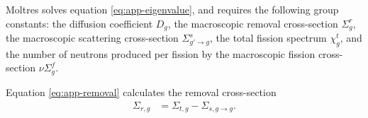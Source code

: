 Moltres solves equation \ref{eq:app-eigenvalue}, and requires the following group constants: the diffusion coefficient $D_g$, the macroscopic removal cross-section $\Sigma_g^r$, the macroscopic scattering cross-section $\Sigma_{g'\rightarrow g}^s$, the total fission spectrum $\chi_g^t$, and the number of neutrons produced per fission by the macroscopic fission cross-section $\nu\Sigma_g^f$.

Equation \ref{eq:app-removal} calculates the removal cross-section \cite{duderstadt_nuclear_1976}
\begin{align}
\Sigma_{r,g} &= \Sigma_{t,g} - \Sigma_{s, g \rightarrow g}. \label{eq:app-removal}
\end{align}
